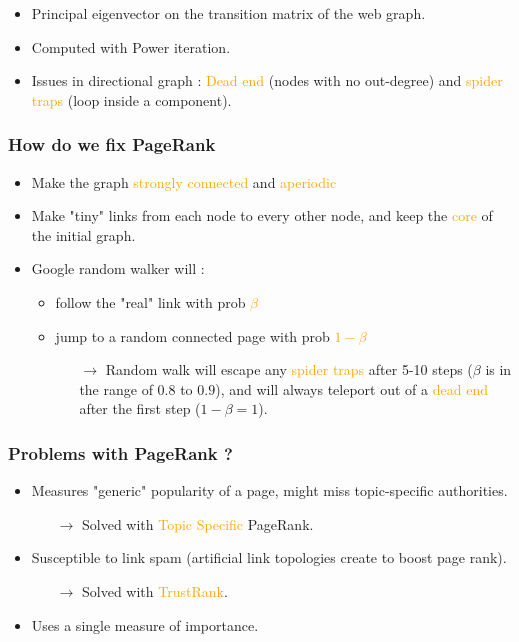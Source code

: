 \begin{itemize}
\item Principal eigenvector on the transition matrix of the web graph.
\item Computed with Power iteration.
\item Issues in directional graph : \textcolor{orange}{Dead end} (nodes with no out-degree) and \textcolor{orange}{spider traps} (loop inside a component).
\end{itemize}

\newpage
\subsubsection{How do we fix PageRank}

\begin{itemize}
\item Make the graph \textcolor{orange}{strongly connected} and \textcolor{orange}{aperiodic}
\item Make "tiny" links from each node to every other node, and keep the \textcolor{orange}{core} of the initial graph.
\item Google random walker will :
	\begin{itemize}
	\item follow the "real" link with prob \textcolor{orange}{$\beta$}
	\item jump to a random connected page with prob \textcolor{orange}{$1-\beta$}
		\begin{itemize}
		\item[$\rightarrow$] Random walk will escape any \textcolor{orange}{spider traps} after 5-10 steps ($\beta$ is in the range of $0.8$ to $0.9$), and will always teleport out of a \textcolor{orange}{dead end} after the first step ($1-\beta=1$).
		\end{itemize}
	\end{itemize}
\end{itemize}

\subsubsection{Problems with PageRank ?}

\begin{itemize}
\item Measures "generic" popularity of a page, might miss topic-specific authorities.
	\begin{itemize}
	\item[$\rightarrow$] Solved with \textcolor{orange}{Topic Specific} PageRank.
	\end{itemize}
\item Susceptible to link spam (artificial link topologies create to boost page rank).
	\begin{itemize}
	\item[$\rightarrow$] Solved with \textcolor{orange}{TrustRank}.
	\end{itemize}
\item Uses a single measure of importance.
\end{itemize}

